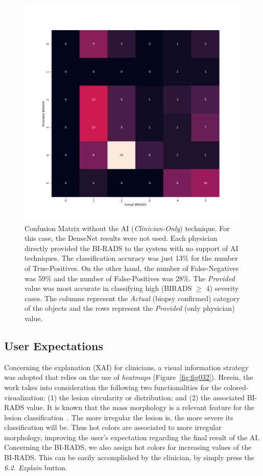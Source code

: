 \begin{figure}[htbp]
\centering
\includegraphics[width=\textwidth]{images/fig044}
\caption{Confusion Matrix without the AI ({\it Clinician-Only}) technique. For this case, the DenseNet results were not used. Each physician directly provided the BI-RADS to the system with no support of AI techniques. The classification accuracy was just 13\% for the number of True-Positives. On the other hand, the number of False-Negatives was 59\% and the number of False-Positives was 28\%. The {\it Provided} value was most accurate in classifying high (BIRADS $\ge$ 4) severity cases. The columns represent the {\it Actual} (biopsy confirmed) category of the objects and the rows represent the {\it Provided} (only physician) value.}
\label{fig:fig044}
\end{figure}

\subsection{User Expectations}
\label{sec:app002004002}

Concerning the explanation (\ac{XAI}) for clinicians, a visual information strategy was adopted that relies on the use of {\it heatmaps} (Figure~\ref{fig:fig032}).
Herein, the work takes into consideration the following two functionalities for the colored-visualization:
(1) the lesion circularity or distribution; and
(2) the associated \ac{BI-RADS} value.
It is known that the mass morphology is a relevant feature for the lesion classification~\cite{maicas2018training}.
The more irregular the lesion is, the more severe its classification will be.
Thus hot colors are associated to more irregular morphology, improving the user's expectation regarding the final result of the \ac{AI}.
Concerning the \ac{BI-RADS}, we also assign hot colors for increasing values of the \ac{BI-RADS}. 
This can be easily accomplished by the clinician, by simply press the {\it 6.2. Explain} button.

